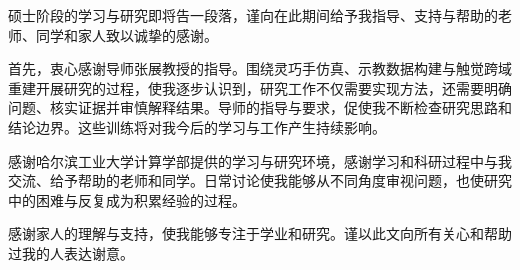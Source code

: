 \begin{acknowledgements}
硕士阶段的学习与研究即将告一段落，谨向在此期间给予我指导、支持与帮助的老师、同学和家人致以诚挚的感谢。

首先，衷心感谢导师张展教授的指导。围绕灵巧手仿真、示教数据构建与触觉跨域重建开展研究的过程，使我逐步认识到，研究工作不仅需要实现方法，还需要明确问题、核实证据并审慎解释结果。导师的指导与要求，促使我不断检查研究思路和结论边界。这些训练将对我今后的学习与工作产生持续影响。

感谢哈尔滨工业大学计算学部提供的学习与研究环境，感谢学习和科研过程中与我交流、给予帮助的老师和同学。日常讨论使我能够从不同角度审视问题，也使研究中的困难与反复成为积累经验的过程。

感谢家人的理解与支持，使我能够专注于学业和研究。谨以此文向所有关心和帮助过我的人表达谢意。

\end{acknowledgements}

